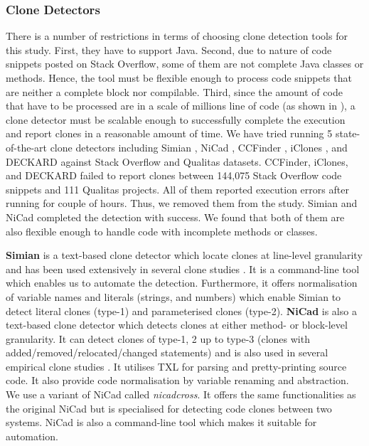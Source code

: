 \documentclass[sigconf,review, anonymous]{acmart}
\begin{document}
\subsubsection{Clone Detectors}
There is a number of restrictions in terms of choosing clone detection tools for this study. First, they have to support Java. Second, due to nature of code snippets posted on Stack Overflow, some of them are not complete Java classes or methods. Hence, the tool must be flexible enough to process code snippets that are neither a complete block nor compilable. Third, since the amount of code that have to be processed are in a scale of millions line of code (as shown in ), a clone detector must be scalable enough to successfully complete the execution and report clones in a reasonable amount of time. We have tried running 5 state-of-the-art clone detectors including Simian \cite{simian}, NiCad \cite{Cordy,Roy2008}, CCFinder \cite{Kamiya2002}, iClones \cite{Gode2009}, and DECKARD \cite{Jiang2007a} against Stack Overflow and Qualitas datasets. CCFinder, iClones, and DECKARD failed to report clones between 144,075 Stack Overflow code snippets and 111 Qualitas projects. All of them reported execution errors after running for couple of hours. Thus, we removed them from the study. Simian and NiCad completed the detection with success. We found that both of them are also flexible enough to handle code with incomplete methods or classes. %

\textbf{Simian} is a text-based clone detector which locate clones at line-level granularity and has been used extensively in several clone studies \cite{Ragkhitwetsagul2016, Wang2013, Mondal2011, Cheung2015, Krinke2010}. It is a command-line tool which enables us to automate the detection. Furthermore, it offers normalisation of variable names and literals (strings, and numbers) which enable Simian to detect literal clones (type-1) and parameterised clones (type-2). \textbf{NiCad} is also a text-based clone detector which detects clones at either method- or block-level granularity. It can detect clones of type-1, 2 up to type-3 (clones with added/removed/relocated/changed statements) and is also used in several empirical clone studies \cite{Roy2008, Ragkhitwetsagul2016, Svajlenko2014, Wang2013, Mondal2011, Sajnani2016}. It utilises TXL \cite{Cordy2006} for parsing and pretty-printing source code. It also provide code normalisation by variable renaming and abstraction. We use a variant of NiCad called \textit{nicadcross}. It offers the same functionalities as the original NiCad but is specialised for detecting code clones between two systems. NiCad is also a command-line tool which makes it suitable for automation.
\end{document}

